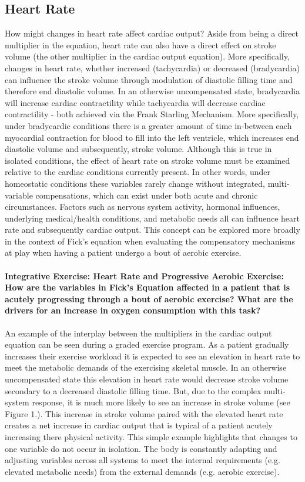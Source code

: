 \subsection{Heart Rate}
How might changes in heart rate affect cardiac output? Aside from being a direct multiplier in the equation, heart rate can also have a direct effect on stroke volume (the other multiplier in the cardiac output equation). More specifically, changes in heart rate, whether increased (tachycardia) or decreased (bradycardia) can influence the stroke volume through modulation of diastolic filling time and therefore end diastolic volume. In an otherwise uncompensated state, bradycardia will increase cardiac contractility while tachycardia will decrease cardiac contractility - both achieved via the Frank Starling Mechanism.  More specifically, under bradycardic conditions there is a greater amount of time in-between each myocardial contraction for blood to fill into the left ventricle, which increases end diastolic volume and subsequently, stroke volume. Although this is true in isolated conditions, the effect of heart rate on stroke volume must be examined relative to the cardiac conditions currently present. In other words, under homeostatic conditions these variables rarely change without integrated, multi-variable compensations, which can exist under both acute and chronic circumstances.  Factors such as nervous system activity, hormonal influences, underlying medical/health conditions, and metabolic needs all can influence heart rate and subsequently cardiac output. This concept can be explored more broadly in the context of Fick's equation when evaluating the compensatory mechanisms at play when having a patient undergo a bout of aerobic exercise. 

\paragraph{Integrative Exercise: Heart Rate and Progressive Aerobic Exercise: How are the variables in Fick's Equation affected in a patient that is acutely progressing through a bout of aerobic exercise? What are the drivers for an increase in oxygen consumption with this task?}
An example of the interplay between the multipliers in the cardiac output equation can be seen during a graded exercise program. As a patient gradually increases their exercise workload it is expected to see an elevation in heart rate to meet the metabolic demands of the exercising skeletal muscle. In an otherwise uncompensated state this elevation in heart rate would decrease stroke volume secondary to a decreased diastolic filling time. But, due to the complex multi-system response, it is much more likely to see an increase in stroke volume (see Figure 1.). This increase in stroke volume paired with the elevated heart rate creates a net increase in cardiac output that is typical of a patient acutely increasing there physical activity. This simple example highlights that changes to one variable do not occur in isolation. The body is constantly adapting and adjusting variables across all systems to meet the internal requirements (e.g. elevated metabolic needs) from the external demands (e.g. aerobic exercise). 

